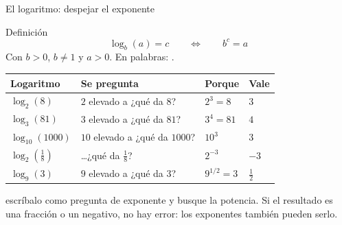 \documentclass[aspectratio=169,10pt]{beamer}
\begin{document}
\begin{frame}{El logaritmo: despejar el exponente}
  \scriptsize
  \begin{block}{Definición}
    \scriptsize
    \[ \log_{b}(a) = c \qquad\Longleftrightarrow\qquad b^{c} = a \]
    Con $b>0$, $b\neq 1$ y $a>0$. En palabras:
    .
  \end{block}

  \vspace{0.1cm}
  \begin{center}
  \begin{tabular}{@{}llll@{}}
    \toprule
    \textbf{Logaritmo} & \textbf{Se pregunta} & \textbf{Porque} &
    \textbf{Vale} \\
    \midrule
    $\log_{2}(8)$ & $2$ elevado a ¿qué da $8$? & $2^{3}=8$ & $3$ \\
    $\log_{3}(81)$ & $3$ elevado a ¿qué da $81$? & $3^{4}=81$ & $4$ \\
    $\log_{10}(1000)$ & $10$ elevado a ¿qué da $1000$? & $10^{3}$ & $3$ \\
    $\log_{2}\!\left(\tfrac{1}{8}\right)$ & \dots ¿qué da $\tfrac{1}{8}$? &
      $2^{-3}$ & $-3$ \\
    $\log_{9}(3)$ & $9$ elevado a ¿qué da $3$? & $9^{1/2}=3$ &
      $\tfrac{1}{2}$ \\
    \bottomrule
  \end{tabular}
  \end{center}

  \vspace{0.06cm}
  {\tiny\color{uniGris}  escríbalo como pregunta de exponente y busque la potencia. Si el
  resultado es una fracción o un negativo, no hay error: los exponentes
  también pueden serlo.}
\end{frame}
\end{document}
